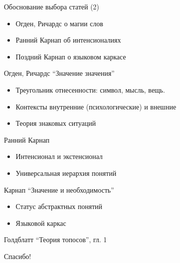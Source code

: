 \documentclass{beamer}
\begin{document}
\begin{frame}{Обоснование выбора статей (2)}
  \begin{itemize}
    \item Огден, Ричардс о магии слов
    \item Ранний Карнап об интенсионалиях
    \item Поздний Карнап о языковом каркасе
  \end{itemize}
\end{frame}


\begin{frame}{Огден, Ричардс ``Значение значения''}
  \begin{itemize}
    \item Треугольник отнесенности: символ, мысль, вещь.
    \item Контексты внутренние (психологические) и внешние
    \item Теория знаковых ситуаций
  \end{itemize}
\end{frame}

\begin{frame}{Ранний Карнап}
  \begin{itemize}
    \item Интенсионал и экстенсионал
    \item Универсальная иерархия понятий
  \end{itemize}
\end{frame}

\begin{frame}{Карнап ``Значение и необходимость''}
  \begin{itemize}
    \item Статус абстрактных понятий
    \item Языковой каркас
  \end{itemize}
\end{frame}

\begin{frame}{Голдблатт ``Теория топосов'', гл. 1}
\end{frame}


\begin{frame}{}
    \thispagestyle{empty}
    \begin{center}
        {\large Спасибо!}
    \end{center}
\end{frame}


\end{document}
